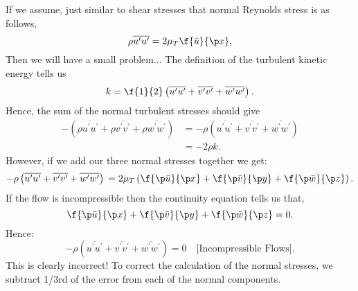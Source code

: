 If we assume, just similar to shear stresses that normal Reynolds stress is as follows,
%
\begin{equation}
  \rho \overline{u^\prime u^\prime} = 2 \mu_T \f{\bar{u}}{\p x},
  \label{eq:normal-Reynolds-stree-incorrect}
\end{equation}
%
Then we will have a small problem...
The definition of the turbulent kinetic energy tells us
%
\begin{equation}
    k = \f{1}{2} \left(\overline{u^\prime u^\prime} + \overline{v^\prime v^\prime} + \overline{w^\prime w^\prime}\right).
\end{equation}
%
Hence, the sum of the normal turbulent stresses should give
%
\begin{equation}
  \begin{aligned}
    -\left(\rho \overline{u^\prime u^\prime} + \rho \overline{v^\prime v^\prime} + \rho \overline{w^\prime w^\prime}\right)
    &= -\rho \left(\overline{u^\prime u^\prime} + \overline{v^\prime v^\prime} + \overline{w^\prime w^\prime}\right) \\
    &= -2 \rho k.
  \end{aligned}
\end{equation}
%
However, if we add our three normal stresses together we get:
%
\begin{equation}
   -\rho \left(\overline{u^\prime u^\prime} + \overline{v^\prime v^\prime} + \overline{w^\prime w^\prime}\right) \\
   =
   2 \mu_T \left(\f{\p \bar{u}}{\p x} + \f{\p \bar{v}}{\p y} + \f{\p \bar{w}}{\p z} \right).
\end{equation}
%
If the flow is incompressible then the continuity equation tells us that,
%
\begin{equation}
  \f{\p \bar{u}}{\p x} + \f{\p \bar{v}}{\p y} + \f{\p \bar{w}}{\p z} = 0.
\end{equation}
%
Hence:
%
\begin{equation}
   -\rho \left(\overline{u^\prime u^\prime} + \overline{v^\prime v^\prime} + \overline{w^\prime w^\prime}\right)
   = 0\quad \text{[Incompressible Flows]}.
\end{equation}
%
This is clearly incorrect!
To correct the calculation of the normal stresses, we subtract 1/3rd of the error from each of the normal components.
%

